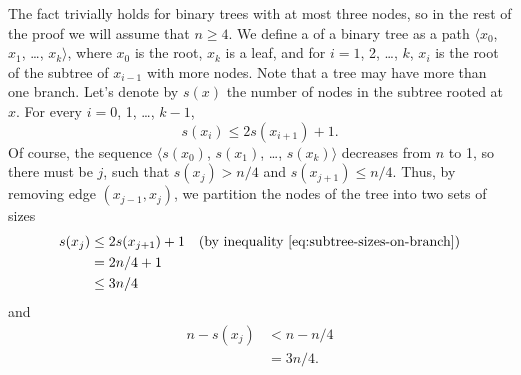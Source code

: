 The fact trivially holds for binary trees with at most three nodes, so in the rest of the proof we will assume that $n\ge4$.
We define a  of a binary tree as a path $\langle x_0$, $x_1$, \dots, $x_k\rangle$, where $x_0$ is the root, $x_k$ is a leaf, and for $i=1$, 2, \dots, $k$, $x_i$ is the root of the subtree of $x_{i-1}$ with more nodes.
Note that a tree may have more than one branch.
Let's denote by $s(x)$ the number of nodes in the subtree rooted at $x$.
For every $i=0$, 1, \dots, $k-1$,
\begin{equation} \label{eq:subtree-sizes-on-branch}
    s(x_i) \le 2s(x_{i+1})+1.
\end{equation}
Of course, the sequence $\langle s(x_0)$, $s(x_1)$, \dots, $s(x_k)\rangle$ decreases from $n$ to 1, so there must be $j$, such that $s(x_j)>n/4$ and $s(x_{j+1})\le n/4$.
Thus, by removing edge $(x_{j-1},x_j)$, we partition the nodes of the tree into two sets of sizes
\begin{align*}
    s(x_j) &\le 2s(x_{j+1})+1 && \text{(by inequality \eqref{eq:subtree-sizes-on-branch})} \\
    &= 2n/4+1 \\
    &\le 3n/4
\end{align*}
and
\begin{align*}
    n-s(x_j) &< n-n/4 \\
    &= 3n/4.
\end{align*}
